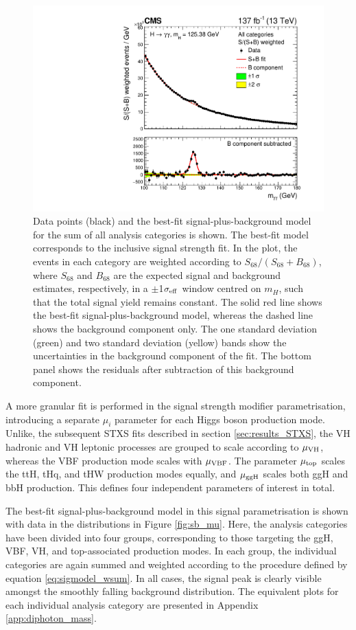 \begin{figure}[htb!]
  \centering
  \includegraphics[width=.6\textwidth]{Figures/hgg_results/sPlusBweighted.pdf}
  \caption[Observed diphoton mass distribution for the sum of all analysis categories]
  {
    Data points (black) and the best-fit signal-plus-background model for the sum of all analysis categories is shown. The best-fit model corresponds to the inclusive signal strength fit. In the plot, the events in each category are weighted according to $S_{68}/(S_{68}+B_{68})$, where $S_{68}$ and $B_{68}$ are the expected signal and background estimates, respectively, in a $\pm$1$\sigma_{\rm{eff}}$ window centred on $m_H$, such that the total signal yield remains constant. The solid red line shows the best-fit signal-plus-background model, whereas the dashed line shows the background component only. The one standard deviation (green) and two standard deviation (yellow) bands show the uncertainties in the background component of the fit. The bottom panel shows the residuals after subtraction of this background component.
  }
  \label{fig:sb_inclusive}
\end{figure}

A more granular fit is performed in the signal strength modifier parametrisation, introducing a separate $\mu_i$ parameter for each Higgs boson production mode. Unlike, the subsequent STXS fits described in section \ref{sec:results_STXS}, the VH hadronic and VH leptonic processes are grouped to scale according to $\mu_{\rm{VH}}$, whereas the VBF production mode scales with $\mu_{\rm{VBF}}$. The parameter $\mu_{\rm{top}}$ scales the ttH, tHq, and tHW production modes equally, and $\mu_{\rm{ggH}}$ scales both ggH and bbH production. This defines four independent parameters of interest in total.

The best-fit signal-plus-background model in this signal parametrisation is shown with data in the \mgg distributions in Figure \ref{fig:sb_mu}. Here, the analysis categories have been divided into four groups, corresponding to those targeting the ggH, VBF, VH, and top-associated production modes. In each group, the individual categories are again summed and weighted according to the procedure defined by equation \ref{eq:sigmodel_wsum}. In all cases, the signal peak is clearly visible amongst the smoothly falling background distribution. The equivalent plots for each individual analysis category are presented in Appendix \ref{app:diphoton_mass}.

